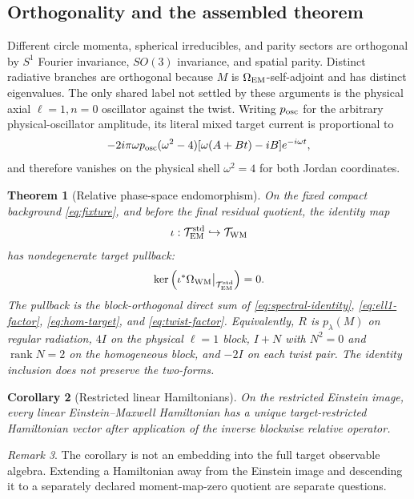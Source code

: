 \documentclass[11pt]{article}
\newtheorem{theorem}{Theorem}[section]
\newtheorem{corollary}[theorem]{Corollary}
\theoremstyle{remark}
\newtheorem{remark}[theorem]{Remark}
\newcommand{\cT}{\mathcal T}
\newcommand{\rank}{\operatorname{rank}}
\begin{document}
\subsection{Orthogonality and the assembled theorem}
Different circle momenta, spherical irreducibles, and parity sectors are
orthogonal by $S^1$ Fourier invariance, $SO(3)$ invariance, and spatial
parity. Distinct radiative branches are orthogonal because $M$ is
$\Omega_{\rm EM}$-self-adjoint and has distinct eigenvalues. The only shared
label not settled by these arguments is the physical axial
$\ell=1,n=0$ oscillator against the twist. Writing $p_{\rm osc}$ for the
arbitrary physical-oscillator amplitude, its literal mixed target current is
proportional to
\begin{equation}
 -2i\pi\omega p_{\rm osc}(\omega^2-4)
 [\omega(A+Bt)-iB]e^{-i\omega t},
\end{equation}
and therefore vanishes on the physical shell $\omega^2=4$ for both Jordan
coordinates.

\begin{theorem}[Relative phase-space endomorphism]
\label{thm:standard-inclusion}
On the fixed compact background \eqref{eq:fixture}, and before the final
residual quotient, the identity map
\begin{equation}
 \iota:\cT_{\rm EM}^{\rm std}\hookrightarrow\cT_{\rm WM}
\end{equation}
has nondegenerate target pullback:
\begin{equation}
 \ker\left(\iota^*\Omega_{\rm WM}
       \big|_{\cT_{\rm EM}^{\rm std}}\right)=0.
\end{equation}
The pullback is the block-orthogonal direct sum of
\eqref{eq:spectral-identity}, \eqref{eq:ell1-factor},
\eqref{eq:hom-target}, and \eqref{eq:twist-factor}. Equivalently, $R$ is
$p_\lambda(M)$ on regular radiation, $4I$ on the physical $\ell=1$ block,
$I+N$ with $N^2=0$ and $\rank N=2$ on the homogeneous block, and $-2I$ on
each twist pair. The identity inclusion does not preserve the two-forms.
\end{theorem}

\begin{corollary}[Restricted linear Hamiltonians]
On the restricted Einstein image, every linear Einstein--Maxwell Hamiltonian
has a unique target-restricted Hamiltonian vector after application of the
inverse blockwise relative operator.
\end{corollary}

\begin{remark}
The corollary is not an embedding into the full target observable algebra.
Extending a Hamiltonian away from the Einstein image and descending it to a
separately declared moment-map-zero quotient are separate questions.
\end{remark}
\end{document}
